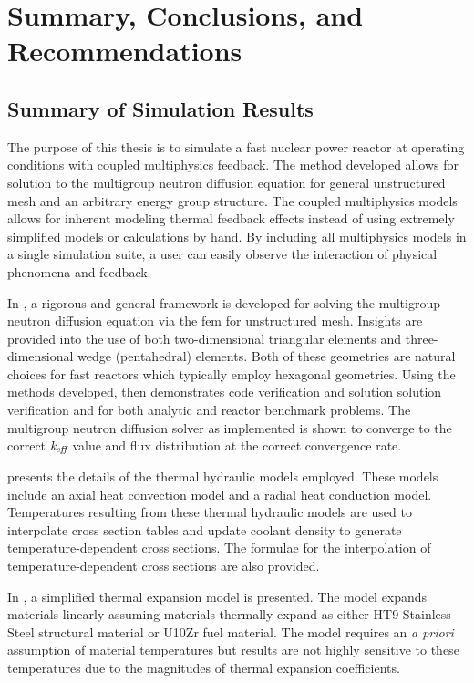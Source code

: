 \chapter{Summary, Conclusions, and Recommendations}
\label{ch:conclusions}

\section{Summary of Simulation Results}

  The purpose of this thesis is to simulate a fast nuclear power reactor at 
  operating conditions with coupled multiphysics feedback. The method
  developed allows for solution to the multigroup neutron diffusion equation for
  general unstructured mesh and an arbitrary energy group structure. The coupled 
  multiphysics models allows for inherent modeling thermal feedback effects 
  instead of using extremely simplified models or calculations by hand. By 
  including all multiphysics models in a single simulation suite, a user can 
  easily observe the interaction of physical phenomena and feedback.

  In , a rigorous and general framework is developed
  for solving the multigroup neutron diffusion equation via the \gls{fem} for
  unstructured mesh. Insights are provided into the use of both
  two-dimensional triangular elements and three-dimensional wedge (pentahedral)
  elements. Both of these geometries are natural choices for fast reactors which 
  typically employ hexagonal geometries. Using the methods developed,
   then demonstrates code verification and solution
  solution verification and for both analytic and reactor benchmark problems. 
  The multigroup neutron diffusion solver as implemented is shown to converge to 
  the correct $k_{\!\mbox{\scriptsize \em eff}}$ value and flux distribution at the correct convergence 
  rate.

   presents the details of the thermal hydraulic
  models employed. These models include an axial heat convection model and a
  radial heat conduction model. Temperatures resulting from these thermal
  hydraulic models are used to interpolate cross section tables and update
  coolant density to generate temperature-dependent cross sections. The formulae
  for the interpolation of temperature-dependent cross sections are also
  provided.

  In , a simplified thermal expansion model is
  presented. The model expands materials linearly assuming materials thermally
  expand as either HT9 Stainless-Steel structural material or U10Zr fuel 
  material. The model requires an \textit{a priori} assumption of material 
  temperatures but results are not highly sensitive to these temperatures due 
  to the magnitudes of thermal expansion coefficients.

